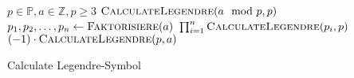 \documentclass{article}
\newcommand{\tikzmark}[1]{\tikz[overlay,remember picture] \node (#1) {};}
\newcommand*{\AddNote}[4]{%
    \begin{tikzpicture}[overlay, remember picture]
        \draw [decoration={brace,amplitude=0.5em},decorate,very thick]
            ($(#3)!(#1.north)!($(#3)-(0,1)$)$) --  
            ($(#3)!(#2.south)!($(#3)-(0,1)$)$)
                node [align=center, text width=2.5cm, pos=0.5, anchor=west] {#4};
    \end{tikzpicture}
}%
\begin{document}
\begin{preview}
    \begin{algorithm}[H]
        \begin{algorithmic}
            \Require $p \in \mathbb{P}, a \in \mathbb{Z}, p \geq 3$
				\State \Return $\Call{CalculateLegendre}{a \mod p, p}$ 
			 
				\State {} 
			 
				\State {} 
			 
					\State {}
				\Else
					\State {}
				\EndIf	{}
			 
					\State {}
				\Else
					\State {}
				\EndIf {}
			 
				\State $p_1, p_2, \dots, p_n \gets \Call{Faktorisiere}{a}$
				\State \Return $\prod_{i=1}^n \Call{CalculateLegendre}{p_i, p}$ 
			\Else
				\State \Return $(-1) \cdot \Call{CalculateLegendre}{p, a}$
			\EndIf
        \end{algorithmic}
    \caption{Calculate Legendre-Symbol}
    \label{alg:euclidBaseTransformation}
    \end{algorithm}
\end{preview}
\end{document}
